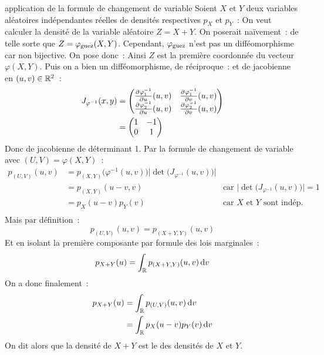 \begin{exemplebreak}{}{application de la formule de changement de variable}
    Soient $X$ et $Y$ deux variables aléatoires indépendantes réelles de densités respectives $p_X$ et $p_Y$~:
    On veut calculer la densité de la variable aléatoire $Z = X + Y$.
    On poserait naïvement~:
    de telle sorte que $Z = \varphi_{\mathrm{guez}}(X,Y)$. Cependant, $\varphi_{\mathrm{guez}}$ n'est pas un difféomorphisme car non bijective. On pose donc~:
    Ainsi $Z$ est la première coordonnée du vecteur $\varphi(X,Y)$. Puis on a bien un difféomorphisme, de réciproque~:
    et de jacobienne en $(u,v) \in \mathbb{R}^2$~:
    \begin{align*}
        J_{\varphi^{-1}}(x,y) &= \begin{pmatrix}
        \frac{\partial^{}\varphi_1^{-1}}{\partial u^{}}(u,v) & \frac{\partial^{}\varphi_1^{-1}}{\partial v^{}}(u,v)\\
        \frac{\partial^{}\varphi_2^{-1}}{\partial u^{}}(u,v) & \frac{\partial^{}\varphi_2^{-1}}{\partial v^{}}(u,v)\\
        \end{pmatrix}\\
        &= \begin{pmatrix}
        1 & -1\\
        0 & 1\\
        \end{pmatrix}
    \end{align*}
    Donc de jacobienne de déterminant 1. Par la formule de changement de variable avec $(U,V) =  \varphi(X,Y)$~:
    \begin{align*}
        p_{(U,V)}(u,v) &= p_{(X,Y)}\Big(\varphi^{-1}(u,v)\Big) \Big\vert \det\Big(J_{\varphi^{-1}}(u,v)\Big)\Big\vert\\
        &= p_{(X,Y)}(u-v,v) \qquad &\text{car } \Big\vert \det\Big(J_{\varphi^{-1}}(u,v)\Big)\Big\vert = 1\\
        &= p_X(u-v)p_Y(v) \qquad &\text{car } X \text{ et } Y \text{ sont indép.}\\
    \end{align*}
    Mais par définition~:
    $$p_{(U,V)}(u,v) = p_{(X+Y,Y)}(u,v)$$
    Et en isolant la première composante par formule des lois marginales~:
    $$p_{X+Y}(u) = \int_{\mathbb{R}} p_{(X+Y,Y)}(u,v) \,\mathrm{d}v$$
    On a donc finalement~:
    \begin{align*}
        p_{X+Y}(u) &= \int_{\mathbb{R}} p_{(U,V)}(u,v) \,\mathrm{d}v\\
        &= \int_{\mathbb{R}} p_X(u-v)p_Y(v) \,\mathrm{d}v
    \end{align*}
    On dit alors que la densité de $X+Y$ est le  des densités de $X$ et $Y$.
    
\end{exemplebreak}

